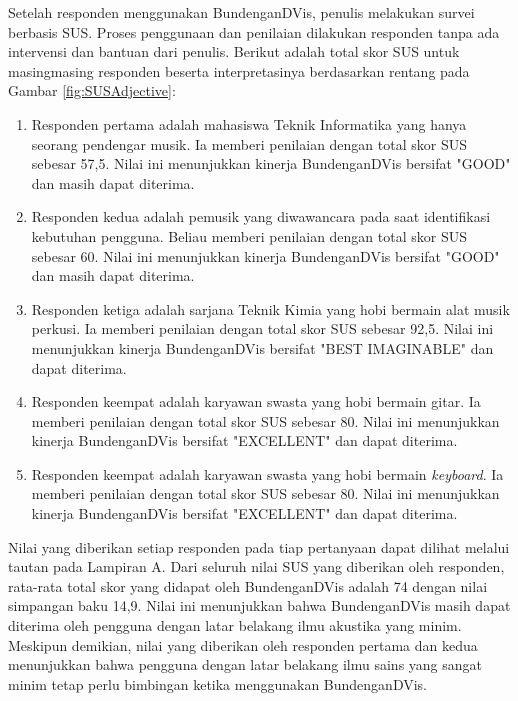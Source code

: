 \newpage
Setelah responden menggunakan BundenganDVis, penulis melakukan survei berbasis SUS. Proses penggunaan dan penilaian dilakukan responden tanpa ada intervensi dan bantuan dari penulis. Berikut adalah total skor SUS untuk masingmasing responden beserta interpretasinya berdasarkan rentang pada Gambar \ref{fig:SUSAdjective}:
\begin{enumerate}
	\item Responden pertama adalah mahasiswa Teknik Informatika yang hanya seorang pendengar musik. Ia memberi penilaian dengan total skor SUS sebesar 57,5. Nilai ini menunjukkan kinerja BundenganDVis bersifat "GOOD" dan masih dapat diterima.
	\item Responden kedua adalah pemusik \bundengan yang diwawancara pada saat identifikasi kebutuhan pengguna. Beliau memberi penilaian dengan total skor SUS sebesar 60. Nilai ini menunjukkan kinerja BundenganDVis bersifat "GOOD" dan masih dapat diterima.
	\item Responden ketiga adalah sarjana Teknik Kimia yang hobi bermain alat musik perkusi. Ia memberi penilaian dengan total skor SUS sebesar 92,5. Nilai ini menunjukkan kinerja BundenganDVis bersifat "BEST IMAGINABLE" dan dapat diterima.
	\item Responden keempat adalah karyawan swasta yang hobi bermain gitar. Ia memberi penilaian dengan total skor SUS sebesar 80. Nilai ini menunjukkan kinerja BundenganDVis bersifat "EXCELLENT" dan dapat diterima.
	\item Responden keempat adalah karyawan swasta yang hobi bermain \emph{keyboard}. Ia memberi penilaian dengan total skor SUS sebesar 80. Nilai ini menunjukkan kinerja BundenganDVis bersifat "EXCELLENT" dan dapat diterima.
\end{enumerate}
Nilai yang diberikan setiap responden pada tiap pertanyaan dapat dilihat melalui tautan pada Lampiran A. Dari seluruh nilai SUS yang diberikan oleh responden, rata-rata total skor yang didapat oleh BundenganDVis adalah 74 dengan nilai simpangan baku 14,9. Nilai ini menunjukkan bahwa BundenganDVis masih dapat diterima oleh pengguna dengan latar belakang ilmu akustika yang minim. Meskipun demikian, nilai yang diberikan oleh responden pertama dan kedua menunjukkan bahwa pengguna dengan latar belakang ilmu sains yang sangat minim tetap perlu bimbingan ketika menggunakan BundenganDVis. \par 

